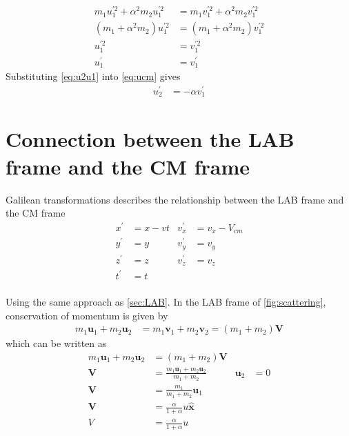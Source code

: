 \documentclass[twoside,english]{uiofysmaster/uiofysmaster}
\let\orgautoref\autoref
\renewcommand{\autoref}
        {%
		 \def\sectionautorefname{Section}%
		 \def\subsectionautorefname{Section}%
		 \def\subsubsectionautorefname{Section}%
		 \def\chapterautorefname{Chapter}%
          \orgautoref}
\begin{document}
\begin{appendices}
\begin{align}
	m_1 u_1^{'2} + \alpha^2 m_2 u_1^{'2} &= m_1 v_1^{'2} + \alpha^2 m_2 v_1^{'2} \nonumber\\
	(m_1 +\alpha^2 m_2) u_1^{'2} &= (m_1 +\alpha^2 m_2) v_1^{'2} \nonumber\\
	u_1^{'2} &= v_1^{'2} \nonumber\\
	u_1^{'} &= v_1^{'}
\end{align}
Substituting \autoref{eq:u2u1} into \autoref{eq:ucm} gives 
\begin{align}\label{eq:u2v1}
	u_2^{'} &= - \alpha v_1^{'}
\end{align}


\section{Connection between the LAB frame and the CM frame}
Galilean transformations describes the relationship between the LAB frame and the CM frame
\begin{align*}
	 x^{'} &= x - vt  & v_x^{'} &= v_x - V_{cm} \\
	 y^{'} &= y & v_y^{'} &= v_y \\
	 z^{'} &= z & v_z^{'} &= v_z \\
	 t^{'} &= t \\
\end{align*}

Using the same approach as \autoref{sec:LAB}. In the LAB frame of \autoref{fig:scattering}, conservation of momentum is given by
\begin{align}\label{eq:comlab}
	m_1 \boldsymbol{u}_1 + m_2 \boldsymbol{u}_2 &= m_1 \boldsymbol{v}_1 + m_2 \boldsymbol{v}_2 = (m_1 + m_2)\boldsymbol{V}
\end{align}
which can be written as
\begin{align}\label{eq:V}
	m_1 \boldsymbol{u}_1 + m_2 \boldsymbol{u}_2 &= (m_1 + m_2)\boldsymbol{V} \nonumber\\
	\boldsymbol{V} &= \frac{m_1 \boldsymbol{u}_1 + m_2 \boldsymbol{u}_2}{m_1 + m_2} & \boldsymbol{u}_2& = 0 \nonumber\\
	\boldsymbol{V} &= \frac{m_1}{m_1 + m_2} \boldsymbol{u}_1 \nonumber\\
	\boldsymbol{V} &= \frac{\alpha}{1 + \alpha} u \boldsymbol{\hat{x}} \nonumber\\
	V &= \frac{\alpha}{1 + \alpha} u
\end{align}


\end{appendices}
\end{document}
